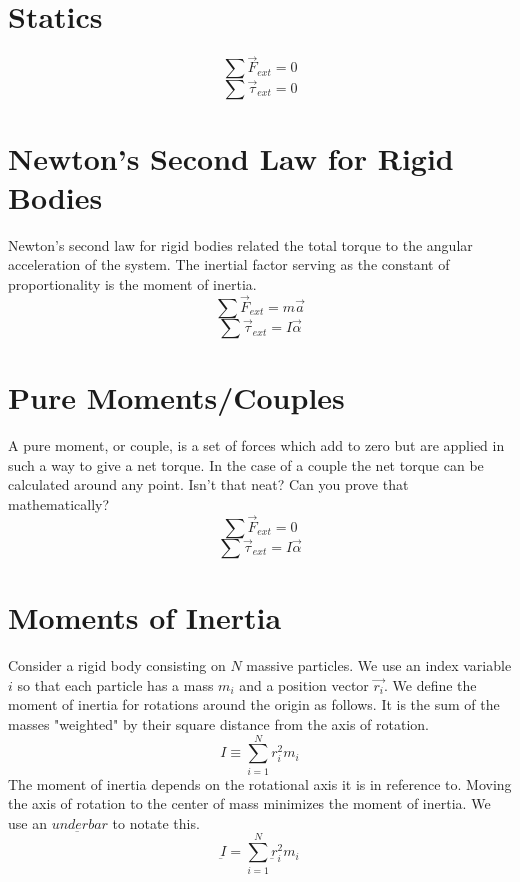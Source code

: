 \section{Statics}
 $$\sum{ \overrightarrow{F}_{ext}}=0$$
  $$\sum{ \overrightarrow{\tau}_{ext}}=0$$
  
  \newpage
  
\section{Newton's Second Law for Rigid Bodies}
Newton's second law for rigid bodies related the total torque to the angular acceleration of the system.  The inertial factor serving as the constant of proportionality is the moment of inertia.
$$\sum{ \overrightarrow{F}_{ext}}=m \overrightarrow{a}$$
$$\sum{ \overrightarrow{\tau}_{ext}}=I \overrightarrow{\alpha}$$
 \vspace{0.1cm}
 
 \section{Pure Moments/Couples}
 A pure moment, or couple, is a set of forces which add to zero but are applied in such a way to give a net torque.  In the case of a couple the net torque can be calculated around any point.  Isn't that neat?  Can you prove that mathematically?
 $$\sum{ \overrightarrow{F}_{ext}}=0$$
  $$\sum{ \overrightarrow{\tau}_{ext}}=I \overrightarrow{\alpha}$$
  \vspace{0.1cm}
  
 \section{Moments of Inertia}
 \vspace{0.1cm}
 Consider a rigid body consisting on $N$ massive particles.  We use an index variable $i$ so that each particle has a mass $m_i$ and a position vector $\overrightarrow{r_i}$.  We define the moment of inertia for rotations around the origin as follows.  It is the sum of the masses "weighted" by their square distance from the axis of rotation.
 \vspace{0.1cm}
$$ I\equiv \sum\limits_{i=1}^{N} r_i^2m_i$$
\vspace{0.1cm}
The moment of inertia depends on the rotational axis it is in reference to.  Moving the axis of rotation to the center of mass minimizes the moment of inertia.  We use an $\underbar{underbar}$ to notate this. 
\vspace{0.1cm}
$$ \underbar{I}=\sum\limits_{i=1}^{N} \underbar{r}_i^2m_i$$

